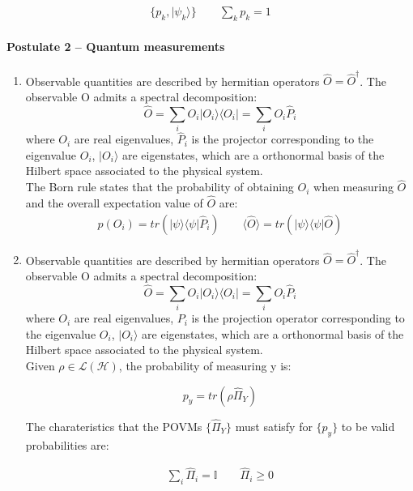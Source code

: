 \begin{align}
    \{p_k, |\psi_k \rangle \}
    \qquad 
    \sum_k p_k = 1
\end{align}


\paragraph{Postulate 2 – Quantum measurements}
\begin{enumerate}
    \renewcommand{\labelenumi}{I)}
    \item Observable quantities are described by hermitian operators $\hat{O} = \hat{O}^{\dagger}$.
    The observable O admits a spectral decomposition:
    \begin{equation} 
        \hat{O} = \sum_i O_i |O_i \rangle \langle O_i | = \sum_i O_i \hat{P}_i
    \end{equation} 
    where $O_i$ are real eigenvalues, $\hat{P}_i$ is the projector corresponding to the eigenvalue $O_i$, $|O_i \rangle$ are eigenstates, which are
    a orthonormal basis of the Hilbert space associated to the physical system.\\
    The Born rule states that the probability of obtaining $O_i$ when measuring $\hat{O}$ and the overall expectation value of $\hat{O}$ are:
    \begin{align}
        p(O_i) = tr(|\psi \rangle \langle \psi | \hat{P}_i) 
        \qquad
        \langle \hat{O} \rangle = tr(|\psi \rangle \langle \psi | \hat{O})
    \end{align}


    \renewcommand{\labelenumi}{O)}
    \item Observable quantities are described by hermitian operators $\hat{O} = \hat{O}^{\dagger}$.
    The observable O admits a spectral decomposition:
    \begin{equation} 
        \hat{O} = \sum_i O_i |O_i \rangle \langle O_i | = \sum_i O_i \hat{P}_i
    \end{equation} 
    where $O_i$ are real eigenvalues, $P_i$ is the projection operator corresponding to the eigenvalue $O_i$, $|O_i \rangle$ are eigenstates, which are
    a orthonormal basis of the Hilbert space associated to the physical system.\\
    Given $\rho \in \mathcal{L}(\mathcal{H})$, the probability of measuring y is:

    \begin{equation}
        p_y = tr(\rho \hat{\Pi}_Y)
    \end{equation}
 
    The charateristics that the POVMs $\{\hat{\Pi}_Y\}$ must satisfy for $\{p_y\}$ to be valid probabilities are:

    \begin{align}
        \sum_i \hat{\Pi}_i = \mathds{I}
        \qquad
        \hat{\Pi}_i \ge 0
    \end{align}

\end{enumerate}

